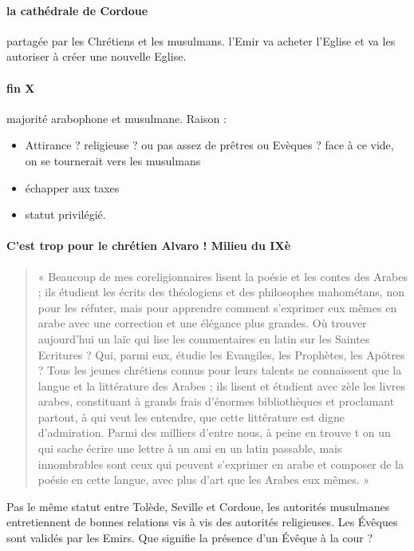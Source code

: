 \paragraph{la cathédrale de Cordoue} partagée par les Chrétiens et les musulmans. l'Emir va acheter l'Eglise et va les autoriser à créer une nouvelle Eglise. 

\paragraph{fin X} majorité arabophone et musulmane. Raison : 
\begin{itemize}
    \item Attirance ? religieuse ? ou pas assez de prêtres ou Evèques ? face à ce vide, on se tournerait vers les musulmans
    \item échapper aux taxes
    \item statut privilégié. 
\end{itemize}


\paragraph{C'est trop pour le chrétien Alvaro ! Milieu du IXè}
\label{par:Alvaro}
\begin{quote}
    «
Beaucoup de mes coreligionnaires lisent la poésie et les contes des Arabes ; ils
étudient les écrits des théologiens et des philosophes mahométans, non pour les
réfuter, mais pour apprendre comment s’exprimer eux mêmes en arabe avec une
correction et une élégance plus grandes. Où trouver aujourd’hui un laïc qui lise les
commentaires en latin sur les Saintes Ecritures ? Qui, parmi eux, étudie les Evangiles,
les Prophètes, les Apôtres ? Tous les jeunes chrétiens connus pour leurs talents ne
connaissent que la langue et la littérature des Arabes ; ils lisent et étudient avec zèle
les livres arabes, constituant à grands frais d’énormes bibliothèques et proclamant
partout, à qui veut les entendre, que cette littérature est digne d’admiration. Parmi des
milliers d’entre nous, à peine en trouve t on un qui sache écrire une lettre à un ami en
un latin passable, mais innombrables sont ceux qui peuvent s’exprimer en arabe et
composer de la poésie en cette langue, avec plus d’art que les Arabes eux mêmes. » 
\end{quote}

Pas le même statut entre Tolède, Seville et Cordoue, les autorités musulmanes entretiennent de bonnes relations vis à vis des autorités religieuses. Les Évêques sont validés par les Emirs. Que signifie la présence d'un Évêque à la cour ? 

